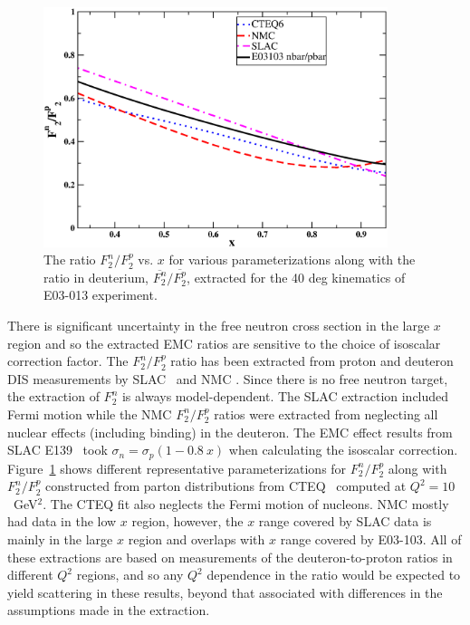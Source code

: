 \begin{figure}[htb]
\begin{center}
\includegraphics[height=70mm,angle=0]{plots/diff_f2nf2p.eps}
\caption{The ratio $F_2^n/F_2^p$ vs. $x$ for various parameterizations
along with the ratio in deuterium, $\overline{F_2^n}/\overline{F_2^p}$, 
extracted for the 40 deg kinematics of E03-013 experiment.
\label{f2nf2p_fig}}
\end{center}
\end{figure}

There is significant uncertainty in the free neutron cross section in the large
$x$ region and so the extracted EMC ratios are sensitive to the choice of 
isoscalar correction factor. The $F_2^n/F_2^p$ ratio has been extracted from
proton and deuteron DIS measurements by SLAC~\cite{slacf2nf2p} and NMC
\cite{nmcf2nf2p1,nmcf2nf2p2}. Since there is no free neutron target, the
extraction of $F_2^n$ is always model-dependent.  The SLAC extraction included
Fermi motion while the NMC $F_2^n/F_2^p$ ratios were extracted from neglecting
all nuclear effects (including binding) in the deuteron. The EMC effect
results from SLAC E139~\cite{slace139} took $\sigma_n=\sigma_p(1-0.8~x)$ when
calculating the isoscalar correction. Figure~\ref{f2nf2p_fig} shows different
representative parameterizations for $F_2^n/F_2^p$ along with $F_2^n/F_2^p$
constructed from parton distributions from CTEQ~\cite{cteq6_pdf} computed at
$Q^2=10$~GeV$^2$. The CTEQ fit also neglects the Fermi motion of nucleons. 
NMC mostly had data in the low $x$ region, however, the $x$ range covered by
SLAC data is mainly in the large $x$ region and overlaps with $x$ range
covered by E03-103.  All of these extractions are based on measurements of the
deuteron-to-proton ratios in different $Q^2$ regions, and so any $Q^2$
dependence in the ratio would be expected to yield scattering in these
results, beyond that associated with differences in the assumptions made in
the extraction.

